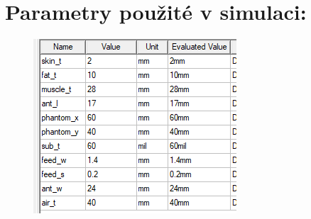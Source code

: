 \documentclass[10pt, a4paper]{article}%
\begin{document}
\section{\Large Parametry použité v simulaci:}
	\begin{figure}[ht!]
		\centering
		\includegraphics[]{global_variables.png}
	\end{figure}
\end{document}
